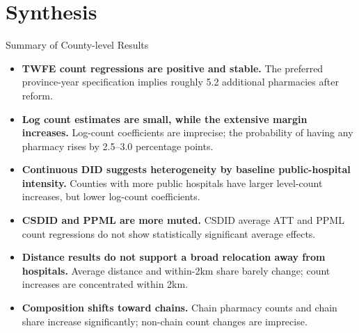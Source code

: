 \documentclass{beamer}
\begin{document}

\section{Synthesis}

\begin{frame}{Summary of County-level Results}

\scriptsize
\begin{itemize}\setlength\itemsep{0.35em}
    \item \textbf{TWFE count regressions are positive and stable.}
    The preferred province-year specification implies roughly 5.2 additional pharmacies after reform.

    \item \textbf{Log count estimates are small, while the extensive margin increases.}
    Log-count coefficients are imprecise; the probability of having any pharmacy rises by 2.5--3.0 percentage points.

    \item \textbf{Continuous DID suggests heterogeneity by baseline public-hospital intensity.}
    Counties with more public hospitals have larger level-count increases, but lower log-count coefficients.

    \item \textbf{CSDID and PPML are more muted.}
    CSDID average ATT and PPML count regressions do not show statistically significant average effects.

    \item \textbf{Distance results do not support a broad relocation away from hospitals.}
    Average distance and within-2km share barely change; count increases are concentrated within 2km.

    \item \textbf{Composition shifts toward chains.}
    Chain pharmacy counts and chain share increase significantly; non-chain count changes are imprecise.
\end{itemize}

\end{frame}
\end{document}
